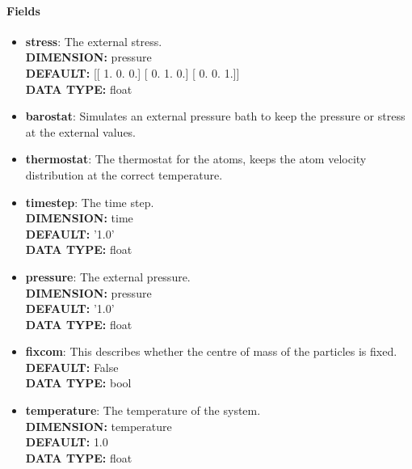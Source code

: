 \begin{itemize}
\paragraph{Fields}
 \begin{itemize}
\item {\bf stress}:
 The external stress.
{\\ \bf DIMENSION: }pressure
{\\ \bf DEFAULT: }
      [[ 1.  0.  0.]
       [ 0.  1.  0.]
       [ 0.  0.  1.]]
{\\ \bf DATA TYPE: }float
\item {\bf barostat}:
 Simulates an external pressure bath to keep the pressure or stress at the external values.
\item {\bf thermostat}:
 The thermostat for the atoms, keeps the atom velocity distribution at the correct temperature.
\item {\bf timestep}:
 The time step.
{\\ \bf DIMENSION: }time
{\\ \bf DEFAULT: }'1.0'
{\\ \bf DATA TYPE: }float
\item {\bf pressure}:
 The external pressure.
{\\ \bf DIMENSION: }pressure
{\\ \bf DEFAULT: }'1.0'
{\\ \bf DATA TYPE: }float
\item {\bf fixcom}:
 This describes whether the centre of mass of the particles is fixed.
{\\ \bf DEFAULT: }False
{\\ \bf DATA TYPE: }bool
\item {\bf temperature}:
 The temperature of the system.
{\\ \bf DIMENSION: }temperature
{\\ \bf DEFAULT: }1.0
{\\ \bf DATA TYPE: }float
\end{itemize}
 
\end{itemize}
 
